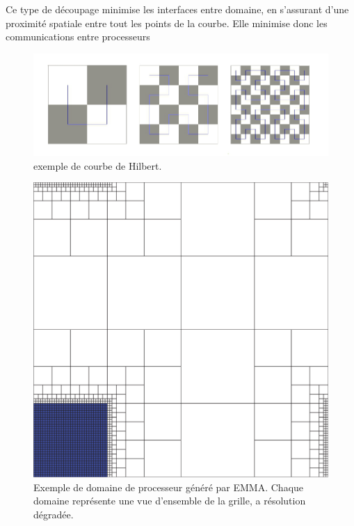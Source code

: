 Ce type de découpage minimise les interfaces entre domaine, en s'assurant d'une proximité spatiale entre tout les points de la courbe.
Elle minimise donc les communications entre processeurs

\begin{figure}[bth]
        \includegraphics[width=.95\linewidth]{img/02/courbe_Hilbert.jpeg} 
        \caption{exemple de courbe de Hilbert. 
}
 		\label{fig:hilbert}
\end{figure}

%


\begin{figure}[bth]
        \includegraphics[width=.95\linewidth]{img/02/secteur.png} 
        \caption{Exemple de domaine de processeur généré par EMMA. 
        Chaque domaine représente une vue d'ensemble de la grille, a résolution dégradée.
}
 		\label{fig:hilbert2}
\end{figure}





